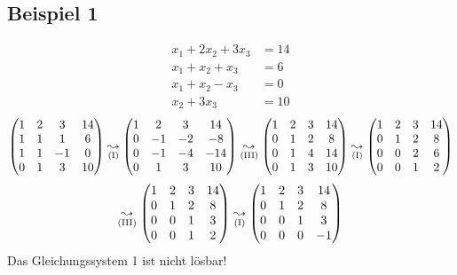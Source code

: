 \subsection{Beispiel 1}
\begin{align*}
x_1 + 2x_2 + 3x_3 &= 14 \\
x_1 + x_2 + x_3 &= 6 \\
x_1 + x_2 - x_3 &=0\\
 x_2 + 3x_3 &= 10 
\end{align*}
\[
\begin{pmatrix}
1 & 2 & 3 & 14 \\
1 & 1 & 1 & 6 \\
1 & 1 & -1 & 0 \\
0 & 1 & 3 & 10 
\end{pmatrix}
\underset{\text{(\RM{1})}}{\leadsto} 
\begin{pmatrix}
1 & 2 & 3 & 14 \\
0 & -1 & -2 & -8 \\
0 & -1 & -4 & -14 \\
0 & 1 & 3 & 10 
\end{pmatrix}
\underset{\text{(\RM{3})}}{\leadsto} 
\begin{pmatrix}
1 & 2 & 3 & 14 \\
0 & 1 & 2 & 8 \\
0 & 1 & 4 & 14 \\
0 & 1 & 3 & 10 
\end{pmatrix}
\underset{\text{(\RM{1})}}{\leadsto} 
\begin{pmatrix}
1 & 2 & 3 & 14 \\
0 & 1 & 2 & 8 \\
0 & 0 & 2 & 6 \\
0 & 0 & 1 & 2 
\end{pmatrix}
\]
\[
\underset{\text{(\RM{3})}}{\leadsto} 
\begin{pmatrix}
1 & 2 & 3 & 14 \\
0 & 1 & 2 & 8 \\
0 & 0 & 1 & 3 \\
0 & 0 & 1 & 2 
\end{pmatrix}
\underset{\text{(\RM{1})}}{\leadsto} 
\begin{pmatrix}
1 & 2 & 3 & 14 \\
0 & 1 & 2 & 8 \\
0 & 0 & 1 & 3 \\
0 & 0 & 0 & -1
\end{pmatrix}
\]
Das Gleichungssystem 1 ist nicht lösbar!

